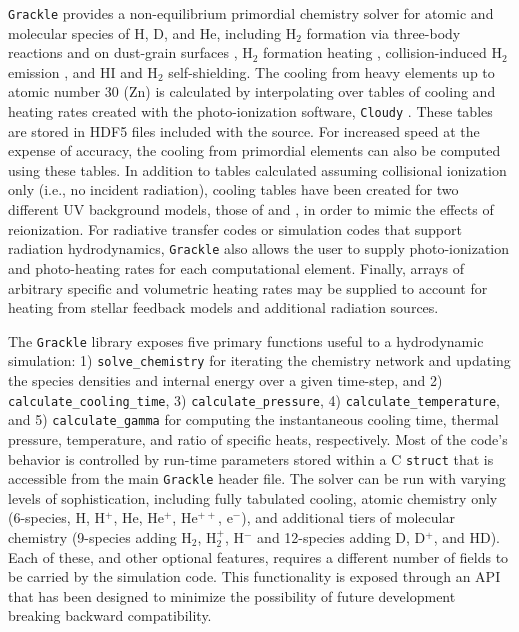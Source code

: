 \documentclass[11pt]{article}
\newcommand{\grackle}{\texttt{Grackle}}
\begin{document}
\begin{flushleft}
\grackle{} provides a non-equilibrium primordial chemistry solver for
atomic and molecular species of H, D, and He, including H$_{2}$
formation via three-body reactions \citep{2002Sci...295...93A,
2011ApJ...726...55T} and on dust-grain surfaces
\citep{1979ApJS...41..555H, 2000ApJ...534..809O, 2014ApJ...783...75M},
H$_{2}$ formation 
heating \citep{2009Sci...325..601T}, collision-induced H$_{2}$
emission \citep{2004MNRAS.348.1019R}, and HI
\citep{2013MNRAS.430.2427R} and H$_{2}$ \citep{2012MNRAS.425L..51W}
self-shielding.  The cooling from heavy elements up to atomic number
30 (Zn) is calculated by interpolating over tables of cooling and
heating rates created with the photo-ionization software,
\texttt{Cloudy} \citep{2013RMxAA..49..137F}.  These
tables are stored in HDF5 files included with the source.  For
increased speed at the expense of accuracy, the cooling from
primordial elements can also be computed using these tables.  In
addition to tables calculated assuming collisional ionization only
(i.e., no incident radiation), cooling tables have been created for two
different UV background models, those of \citet{2009ApJ...703.1416F}
and \citet{2012ApJ...746..125H}, in order to mimic the effects of
reionization.  For radiative transfer codes or simulation codes that
support radiation hydrodynamics, \grackle{} also allows the user to supply
photo-ionization and photo-heating rates for each computational
element.  Finally, arrays of arbitrary specific and volumetric heating
rates may be supplied to account for heating from stellar feedback
models and additional radiation sources.

The \grackle{} library exposes five primary functions useful to a
hydrodynamic simulation: 1) \texttt{solve\_chemistry} for iterating
the chemistry network and updating the species densities and internal
energy over a given time-step, and 2)
\texttt{calculate\_cooling\_time}, 3) \texttt{calculate\_pressure}, 4)
\texttt{calculate\_temperature}, and 5) \texttt{calculate\_gamma} for
computing the instantaneous cooling time, thermal pressure,
temperature, and ratio of specific heats, respectively.  Most of the
code's behavior is controlled by run-time parameters stored within a C
\texttt{struct} that is accessible from the main \grackle{} header
file.  The solver can be run with varying levels of sophistication,
including fully tabulated cooling, atomic chemistry only (6-species,
H, H$^{+}$, He, He$^{+}$, He$^{++}$, e$^{-}$), and additional tiers of
molecular chemistry (9-species adding H$_{2}$, H$_{2}^{+}$, H$^{-}$
and 12-species adding D, D$^{+}$, and HD).  Each of these, and other
optional features, requires a different number of fields to be carried
by the simulation code.  This functionality is exposed through
an API that has been designed to minimize the possibility of future
development breaking backward compatibility.


\end{flushleft}
\end{document}
